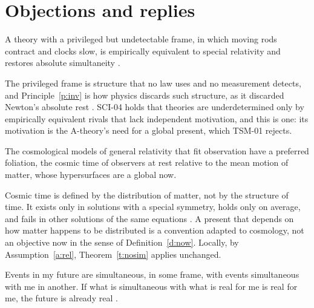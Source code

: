 \documentclass{situationist-preprint}
\begin{document}
\section{Objections and replies}

\begin{objection}\label{o:lorentz}
A theory with a privileged but undetectable frame, in which moving rods contract and clocks slow, is empirically equivalent to special relativity and restores absolute simultaneity \citep{Craig2001}.
\end{objection}

\begin{reply}
The privileged frame is structure that no law uses and no measurement detects, and Principle~\ref{p:inv} is how physics discards such structure, as it discarded Newton's absolute rest \citep{Earman1989}. SCI-04 holds that theories are underdetermined only by empirically equivalent rivals that lack independent motivation, and this is one: its motivation is the A-theory's need for a global present, which TSM-01 rejects.
\end{reply}

\begin{objection}\label{o:cosmic}
The cosmological models of general relativity that fit observation have a preferred foliation, the cosmic time of observers at rest relative to the mean motion of matter, whose hypersurfaces are a global now.
\end{objection}

\begin{reply}
Cosmic time is defined by the distribution of matter, not by the structure of time. It exists only in solutions with a special symmetry, holds only on average, and fails in other solutions of the same equations \citep{Godel1949}. A present that depends on how matter happens to be distributed is a convention adapted to cosmology, not an objective now in the sense of Definition~\ref{d:now}. Locally, by Assumption~\ref{a:rel}, Theorem~\ref{t:nosim} applies unchanged.
\end{reply}

\begin{objection}\label{o:putnam}
Events in my future are simultaneous, in some frame, with events simultaneous with me in another. If what is simultaneous with what is real for me is real for me, the future is already real \citep{Rietdijk1966,Putnam1967}.
\end{objection}
\end{document}
